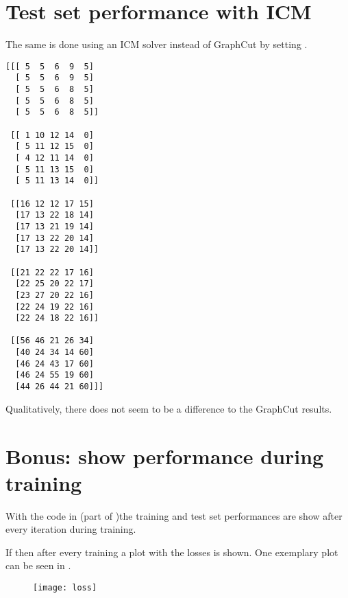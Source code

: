\documentclass[12pt]{scrartcl}
\begin{document}
\section{Test set performance with ICM}

The same is done using an ICM solver instead of GraphCut by setting .

\begin{verbatim}
[[[ 5  5  6  9  5]
  [ 5  5  6  9  5]
  [ 5  5  6  8  5]
  [ 5  5  6  8  5]
  [ 5  5  6  8  5]]

 [[ 1 10 12 14  0]
  [ 5 11 12 15  0]
  [ 4 12 11 14  0]
  [ 5 11 13 15  0]
  [ 5 11 13 14  0]]

 [[16 12 12 17 15]
  [17 13 22 18 14]
  [17 13 21 19 14]
  [17 13 22 20 14]
  [17 13 22 20 14]]

 [[21 22 22 17 16]
  [22 25 20 22 17]
  [23 27 20 22 16]
  [22 24 19 22 16]
  [22 24 18 22 16]]

 [[56 46 21 26 34]
  [40 24 34 14 60]
  [46 24 43 17 60]
  [46 24 55 19 60]
  [44 26 44 21 60]]]
\end{verbatim}

Qualitatively, there does not seem to be a difference to the GraphCut results.

\section{Bonus: show performance during training}

With the code in  (part of )the training and test set performances are show after every iteration during training.

If  then after every training a plot with the losses is shown. One exemplary plot can be seen in .

\begin{figure}
    \centering
    \texttt{[image: loss]}
    \label{fig:bonus}
\end{figure}





\clearpage

\end{document}
